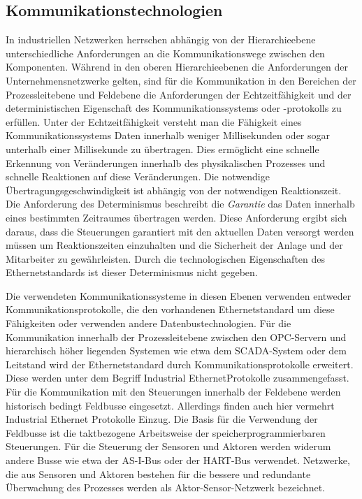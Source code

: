 \subsection{Kommunikationstechnologien}
In industriellen Netzwerken herrschen abhängig von der Hierarchieebene unterschiedliche Anforderungen an die Kommunikationswege zwischen den Komponenten. Während in den oberen Hierarchieebenen die Anforderungen der Unternehmensnetzwerke gelten, sind für die Kommunikation in den Bereichen der Prozessleitebene und Feldebene die Anforderungen der Echtzeitfähigkeit und der deterministischen Eigenschaft des Kommunikationssystems oder -protokolls zu erfüllen. Unter der Echtzeitfähigkeit versteht man die Fähigkeit eines Kommunikationssystems Daten innerhalb weniger Millisekunden oder sogar unterhalb einer Millisekunde zu übertragen. Dies ermöglicht eine schnelle Erkennung von Veränderungen innerhalb des physikalischen Prozesses und schnelle Reaktionen auf diese Veränderungen. Die notwendige Übertragungsgeschwindigkeit ist abhängig von der notwendigen Reaktionszeit. Die Anforderung des Determinismus beschreibt die \textit{Garantie} das Daten innerhalb eines bestimmten Zeitraumes übertragen werden. Diese Anforderung ergibt sich daraus, dass die Steuerungen garantiert mit den aktuellen Daten versorgt werden müssen um Reaktionszeiten einzuhalten und die Sicherheit der Anlage und der Mitarbeiter zu gewährleisten. Durch die technologischen Eigenschaften des Ethernetstandards ist dieser Determinismus nicht gegeben.

Die verwendeten Kommunikationssysteme in diesen Ebenen verwenden entweder Kommunikationsprotokolle, die den vorhandenen Ethernetstandard um diese Fähigkeiten oder verwenden andere Datenbustechnologien. Für die Kommunikation innerhalb der Prozessleitebene zwischen den OPC-Servern und hierarchisch höher liegenden Systemen wie etwa dem SCADA-System oder dem Leitstand wird der Ethernetstandard durch Kommunikationsprotokolle erweitert. Diese werden unter dem Begriff \glqq Industrial Ethernet\grqq Protokolle zusammengefasst. Für die Kommunikation mit den Steuerungen innerhalb der Feldebene werden historisch bedingt Feldbusse eingesetzt. Allerdings finden auch hier vermehrt Industrial Ethernet Protokolle Einzug. Die Basis für die Verwendung der Feldbusse ist die taktbezogene Arbeitsweise der speicherprogrammierbaren Steuerungen. Für die Steuerung der Sensoren und Aktoren werden widerum andere Busse wie etwa der AS-I-Bus oder der HART-Bus verwendet. Netzwerke, die aus Sensoren und Aktoren bestehen für die bessere und redundante Überwachung des Prozesses werden als Aktor-Sensor-Netzwerk bezeichnet.

